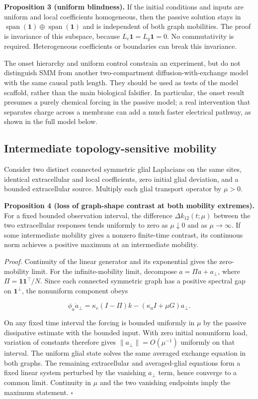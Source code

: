\documentclass[
  11pt,
]{article}
\begin{document}
\textbf{Proposition 3 (uniform blindness).} If the initial conditions
and inputs are uniform and local coefficients homogeneous, then the
passive solution stays in
\(\operatorname{span}(\mathbf1)\oplus\operatorname{span}(\mathbf1)\) and
is independent of both graph mobilities. The proof is invariance of this
subspace, because \(L_e\mathbf1=L_g\mathbf1=0\). No commutativity is
required. Heterogeneous coefficients or boundaries can break this
invariance.

The onset hierarchy and uniform control constrain an experiment, but do
not distinguish SMM from another two-compartment diffusion-with-exchange
model with the same causal path length. They should be used as tests of
the model scaffold, rather than the main biological falsifier. In
particular, the onset result presumes a purely chemical forcing in the
passive model; a real intervention that separates charge across a
membrane can add a much faster electrical pathway, as shown in the full
model below.

\subsection{Intermediate topology-sensitive
mobility}\label{intermediate-topology-sensitive-mobility}

Consider two distinct connected symmetric glial Laplacians on the same
sites, identical extracellular and local coefficients, zero initial
glial deviation, and a bounded extracellular source. Multiply each glial
transport operator by \(\mu>0\).

\textbf{Proposition 4 (loss of graph-shape contrast at both mobility
extremes).} For a fixed bounded observation interval, the difference
\(\Delta k_{12}(t;\mu)\) between the two extracellular responses tends
uniformly to zero as \(\mu\downarrow0\) and as \(\mu\to\infty\). If some
intermediate mobility gives a nonzero finite-time contrast, its
continuous norm achieves a positive maximum at an intermediate mobility.

\emph{Proof.} Continuity of the linear generator and its exponential
gives the zero-mobility limit. For the infinite-mobility limit,
decompose \(a=\Pi a+a_\perp\), where \(\Pi=\mathbf1\mathbf1^\top/N\).
Since each connected symmetric graph has a positive spectral gap on
\(\mathbf1^\perp\), the nonuniform component obeys

\[\phi_a\dot a_\perp=\kappa_e(I-\Pi)k-(\kappa_a I+\mu G)a_\perp.\]

On any fixed time interval the forcing is bounded uniformly in \(\mu\)
by the passive dissipative estimate with the bounded input. With zero
initial nonuniform load, variation of constants therefore gives
\(\|a_\perp\|=O(\mu^{-1})\) uniformly on that interval. The uniform
glial state solves the same averaged exchange equation in both graphs.
The remaining extracellular and averaged-glial equations form a fixed
linear system perturbed by the vanishing \(a_\perp\) term, hence
converge to a common limit. Continuity in \(\mu\) and the two vanishing
endpoints imply the maximum statement. \(\square\)
\end{document}
